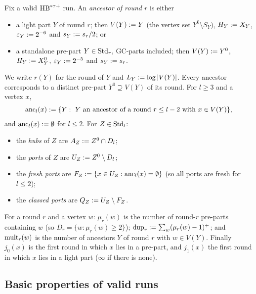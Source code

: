 \begin{definition}\label{s2:defAncestors}
Fix a valid $\mathrm{HB}^{*\tau{+}}$ run. An \emph{ancestor of round $r$} is either
\begin{itemize}
\item a light part $Y$ of round $r$; then $V(Y)\mathrel{:=} Y$ (the vertex set
$Y^0\setminus S_Y$), $H_Y\mathrel{:=} X_Y$, $\varepsilon_Y\mathrel{:=}2^{-6}$ and
$s_Y\mathrel{:=} s_r/2$; or
\item a standalone pre-part $Y\in\mathrm{Std}_r$, GC-parts included; then
$V(Y)\mathrel{:=} Y^0$, $H_Y\mathrel{:=} X^0_Y$, $\varepsilon_Y\mathrel{:=}2^{-5}$ and $s_Y\mathrel{:=} s_r$.
\end{itemize}
We write $r(Y)$ for the round of $Y$ and $L_Y\mathrel{:=}\log|V(Y)|$. Every ancestor
corresponds to a distinct pre-part $Y^0\supseteq V(Y)$ of its round. For
$l\ge3$ and a vertex $x$,
\[
\mathrm{anc}_l(x)\mathrel{:=}\{Y:\ Y\text{ an ancestor of a round }r\le l-2\text{ with }x\in
V(Y)\},
\]
and $\mathrm{anc}_l(x)\mathrel{:=}\emptyset$ for $l\le2$. For $Z\in\mathrm{Std}_l$:
\begin{itemize}
\item the \emph{hubs} of $Z$ are $A_Z\mathrel{:=} Z^0\cap D_l$;
\item the \emph{ports} of $Z$ are $U_Z\mathrel{:=} Z^0\setminus D_l$;
\item the \emph{fresh ports} are $F_Z\mathrel{:=}\{x\in U_Z:\mathrm{anc}_l(x)=\emptyset\}$
(so all ports are fresh for $l\le2$);
\item the \emph{classed ports} are $Q_Z\mathrel{:=} U_Z\setminus F_Z$.
\end{itemize}
For a round $r$ and a vertex $w$: $\mu_r(w)$ is the number of round-$r$
pre-parts containing $w$ (so $D_r=\{w:\mu_r(w)\ge2\}$);
$\mathrm{dup}_r\mathrel{:=}\sum_w(\mu_r(w)-1)^+$; and $\mathrm{mult}_r(w)$ is the number of ancestors
$Y$ of round $r$ with $w\in V(Y)$. Finally $j_0(x)$ is the first round in which
$x$ lies in a pre-part, and $j_1(x)$ the first round in which $x$ lies in a
light part ($\infty$ if there is none).
\deps{\ref{s2:defHBtp}}
\end{definition}

\subsection{Basic properties of valid runs}


